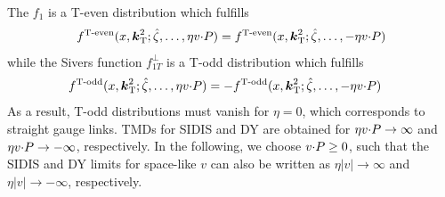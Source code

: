 The $f_1$ is a T-even distribution which fulfills
\begin{align}
	f^{\text{T-even}}(x,\boldsymbol{k}_{\mathrm T}^2;{\hat \zeta},\ldots,\eta v {\cdot} P) = f^{\text{T-even}}(x,\boldsymbol{k}_{\mathrm T}^2;{\hat \zeta},\ldots,-\eta v {\cdot} P)
\end{align}
while the Sivers function $f_{1T}^\perp$ is a T-odd distribution which fulfills
\begin{align}
	f^{\text{T-odd}}(x,\boldsymbol{k}_{\mathrm T}^2;{\hat \zeta},\ldots,\eta v {\cdot} P) & = - f^{\text{T-odd}}(x,\boldsymbol{k}_{\mathrm T}^2;{\hat \zeta},\ldots,-\eta v {\cdot} P)
\end{align}
As a result, T-odd distributions must vanish for $\eta = 0$, which corresponds to straight gauge links.
TMDs for SIDIS and DY are obtained for $\eta v {\cdot} P \rightarrow \infty$ and $\eta v {\cdot} P \rightarrow -\infty$, respectively.
In the following, we choose $v {\cdot} P \geq 0$, such that the SIDIS and DY limits for space-like $v$ can also be written as $\eta |v| \rightarrow \infty$ and $\eta |v| \rightarrow -\infty$, respectively.


